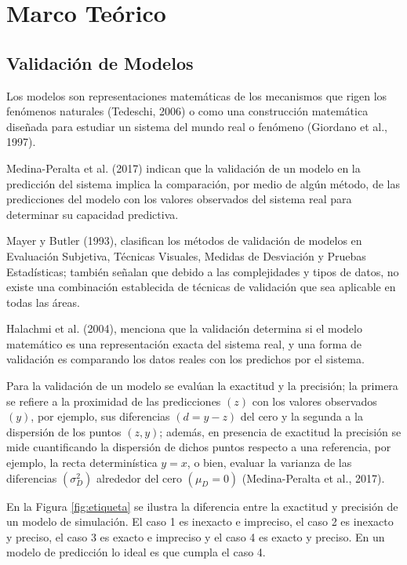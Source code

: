 \section{Marco Teórico}

\subsection{Validación de Modelos}
Los modelos son representaciones matemáticas de los mecanismos que rigen los fenómenos naturales (Tedeschi, 2006) o como una construcción matemática diseñada para estudiar un sistema del mundo real o fenómeno (Giordano et al., 1997).
\vspace{.5cm}

Medina-Peralta et al. (2017) indican que la validación de un modelo en la predicción del sistema implica la comparación, por medio de algún método, de las predicciones del modelo con los valores observados del sistema real para determinar su capacidad predictiva.
\vspace{.5cm}

Mayer y Butler (1993), clasifican los métodos de validación de modelos en Evaluación Subjetiva, Técnicas Visuales, Medidas de Desviación y Pruebas Estadísticas; también señalan que debido a las complejidades y tipos de datos, no existe una combinación establecida de técnicas de validación que sea aplicable en todas las áreas.
\vspace{.5cm}

Halachmi et al. (2004), menciona que la validación determina si el modelo matemático es una representación exacta del sistema real, y una forma de validación es comparando los datos reales con los predichos por el sistema.
\vspace{.5cm}

Para la validación de un modelo se evalúan la exactitud y la precisión; la primera se refiere a la proximidad de las predicciones $( z )$  con los valores observados $( y )$, por ejemplo, sus diferencias $ ( d=y-z ) $ del cero y la segunda a la dispersión de los puntos $ (z, y) $; además, en presencia de exactitud la precisión se mide cuantificando la dispersión de dichos puntos respecto a una referencia, por ejemplo, la recta determinística  $ y=x $, o bien, evaluar la varianza de las diferencias $ (\sigma_{D}^{2}) $ alrededor del cero $ (\mu_{D}=0) $ (Medina-Peralta et al., 2017).
\vspace{.5cm}

En la Figura \ref{fig:etiqueta} se ilustra la diferencia entre la exactitud y precisión de un modelo de simulación. El caso 1 es inexacto e impreciso, el caso 2 es inexacto y preciso, el caso 3 es exacto e impreciso y el caso 4 es exacto y preciso. En un modelo de predicción lo ideal es que cumpla el caso 4. 

